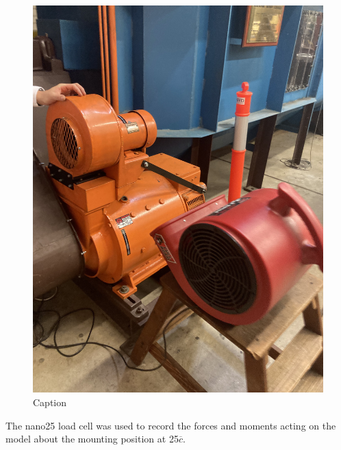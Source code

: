 \begin{figure}
    \centering
    \includegraphics[scale=0.1]{04_Methodology/Figs/cooler.jpg}
    \caption{Caption}
    \label{fig:engineCooler}
\end{figure}

The nano25 load cell was used to record the forces and moments acting on the model about the mounting position at 25$\overline{c}$. 

